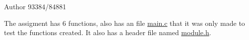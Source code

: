 \begin{DoxyAuthor}{Author}
93384/84881
\end{DoxyAuthor}
The assigment has 6 functions, also has an file \mbox{\hyperlink{main_8c}{main.\+c}} that it was only made to test the functions created. It also has a header file named \mbox{\hyperlink{module_8h}{module.\+h}}. 